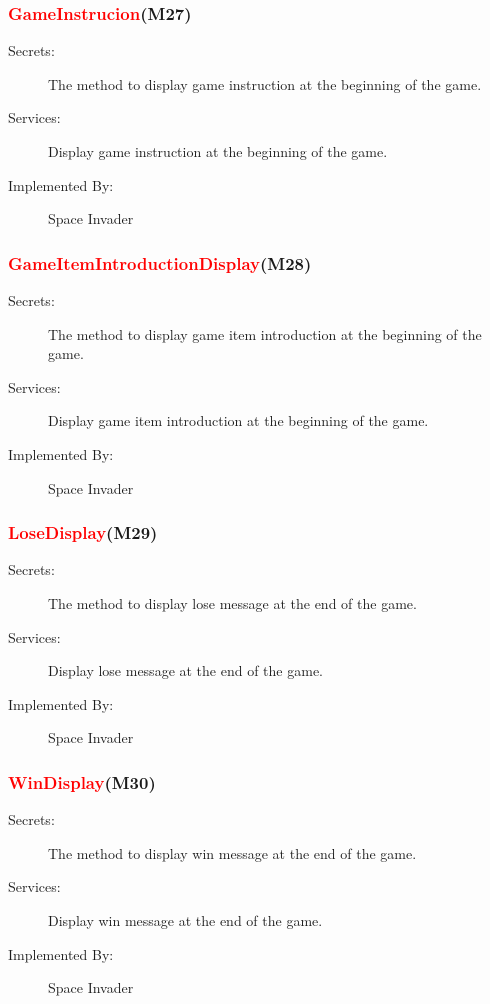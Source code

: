 \documentclass[12pt]{article}
\begin{document}
\subsubsection{\textcolor{red}{GameInstrucion}(M27)}
\begin{description}
\item[Secrets:] The method to display game instruction at the beginning of the game.
\item[Services:]Display game instruction at the beginning of the game.
\item[Implemented By:] Space Invader
\end{description}

\subsubsection{\textcolor{red}{GameItemIntroductionDisplay}(M28)}
\begin{description}
\item[Secrets:] The method to display game item introduction at the beginning of the game.
\item[Services:]Display game item introduction at the beginning of the game.
\item[Implemented By:] Space Invader
\end{description}

\subsubsection{\textcolor{red}{LoseDisplay}(M29)}
\begin{description}
\item[Secrets:] The method to display lose message at the end of the game.
\item[Services:]Display lose message at the end of the game.
\item[Implemented By:] Space Invader
\end{description}

\subsubsection{\textcolor{red}{WinDisplay}(M30)}
\begin{description}
\item[Secrets:] The method to display win message at the end of the game.
\item[Services:]Display win message at the end of the game.
\item[Implemented By:] Space Invader
\end{description}
\end{document}
